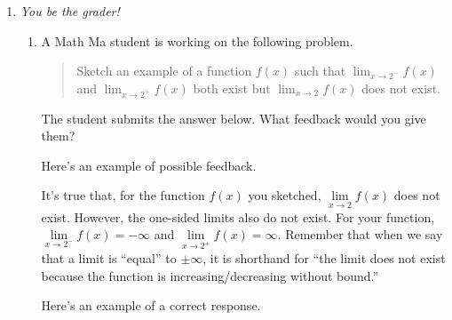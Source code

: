 \documentclass{article}
\begin{document}

\begin{enumerate}
\item  \emph{You be the grader!}

  \begin{enumerate}
  \item
    \begin{problem}[0.25in]
      A Math Ma student is working on the following problem.
      \begin{quote}
        Sketch an example of a function $f(x)$ such that $\displaystyle
        \lim_{x \to 2^-} f(x)$ and $\displaystyle \lim_{x \to 2^+}
        f(x)$ both exist but $\displaystyle \lim_{x \to 2} f(x)$ does not
        exist. 
      \end{quote}
      The student submits the answer below. What feedback would you give them?

    \end{problem}

    \begin{solution}
      Here's an example of possible feedback.

      It's true that, for the function $f(x)$ you sketched, 
      $\lim\limits_{x \to 2} f(x)$ does not exist. However, the one-sided
      limits also do not exist. For your function, 
      $\lim\limits_{x \to 2^-} f(x) = -\infty$
      and $\lim\limits_{x \to 2^+} f(x) = \infty$. Remember that
      when we say that a limit is ``equal'' to $\pm \infty$, it is shorthand
      for ``the limit does not exist because the function is
      increasing/decreasing without bound.''

      Here's an example of a correct response.
      
      

\end{solution}
\end{enumerate}
\end{enumerate}
\end{document}
